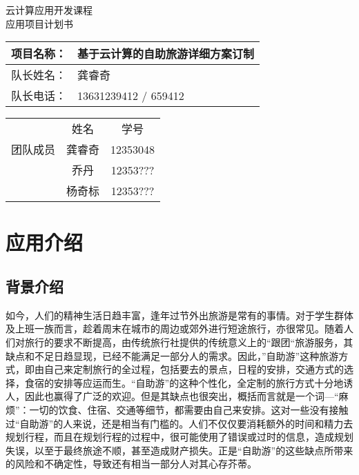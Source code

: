 \documentclass[12pt,a4paper]{article}
\begin{document}
\begin{CJK}{UTF8}{gbsn}
\CJKindent

\begin{titlepage}
\begin{center}
\textsc{\Huge 云计算应用开发课程}\\[0.5cm]
\textsc{\LARGE 应用项目计划书}\\[2.5cm]

\begin{tabular}{ |l|l| }
	\hline
	项目名称： & 基于云计算的自助旅游详细方案订制\\ \hline
	队长姓名： & 龚睿奇\\ \hline
	队长电话： & 13631239412 {\slash} 659412\\
	\hline
\end{tabular}
\end{center}
\vspace{10cm}
\begin{center}
\begin{tabular}{ |c|c|c| }
	\hline
		 & 姓名   & 学号	\\ \cline{2-3}
	团队成员 & 龚睿奇 & 12353048	\\ \cline{2-3}
		 & 乔丹   & 12353???	\\ \cline{2-3}
		 & 杨奇标 & 12353???	\\
	\hline
\end{tabular}
\end{center}

\end{titlepage}

\section{应用介绍}
	\subsection{背景介绍}
	如今，人们的精神生活日趋丰富，逢年过节外出旅游是常有的事情。对于学生群体及上班一族而言，趁着周末在城市的周边或郊外进行短途旅行，亦很常见。随着人们对旅行的要求不断提高，由传统旅行社提供的传统意义上的“跟团“旅游服务，其缺点和不足日趋显现，已经不能满足一部分人的需求。因此，”自助游”这种旅游方式，即由自己来定制旅行的全过程，包括要去的景点，日程的安排，交通方式的选择，食宿的安排等应运而生。“自助游”的这种个性化，全定制的旅行方式十分地诱人，因此也赢得了广泛的欢迎。但是其缺点也很突出，概括而言就是一个词---“麻烦”：一切的饮食、住宿、交通等细节，都需要由自己来安排。这对一些没有接触过“自助游”的人来说，还是相当有门槛的。人们不仅仅要消耗额外的时间和精力去规划行程，而且在规划行程的过程中，很可能使用了错误或过时的信息，造成规划失误，以至于最终旅途不顺，甚至造成财产损失。正是“自助游”的这些缺点所带来的风险和不确定性，导致还有相当一部分人对其心存芥蒂。


\end{CJK}
\end{document}
